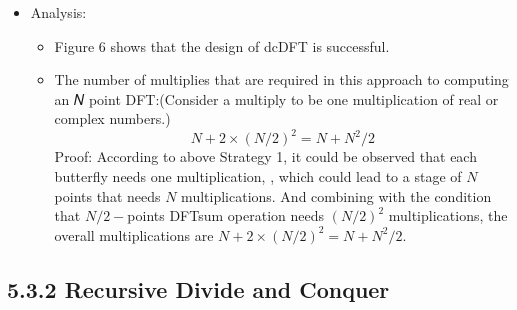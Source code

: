 \documentclass[onecolumn,oneside]{SUSTechHomework}
\begin{document}
\begin{itemize}
\begin{itemize}
\begin{figure}[H]
		\end{figure}		 
	\end{itemize}
	\item Analysis: 
	\begin{itemize}
		\item Figure 6 shows that the design of dcDFT is successful.
		\item The number of multiplies that are required in this approach to computing an 𝑁
		point DFT:(Consider a multiply to be one multiplication of real or complex numbers.)
		$$
		N+2\times(N/2)^2=N+N^2/2
		$$
		Proof: According to above Strategy 1, it could be observed that each butterfly needs one multiplication,
		, which could lead to a stage of $N$ points that needs $N$ multiplications. And combining with the condition 
		that $N/2-$points DFTsum operation needs $(N/2)^2$ multiplications, the overall multiplications are $N+2\times(N/2)^2=N+N^2/2$. 
	\end{itemize}
\end{itemize}
\subsection*{5.3.2 Recursive Divide and Conquer}
\end{document}
